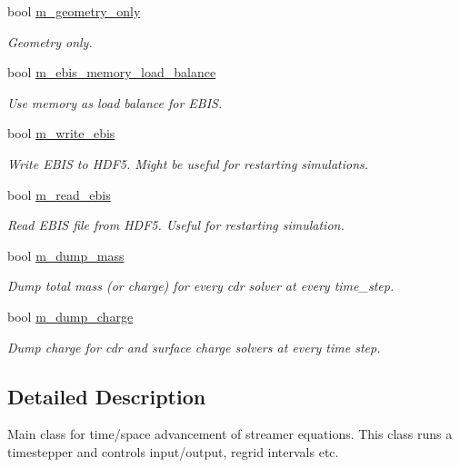 \begin{DoxyCompactItemize}
bool \hyperlink{classplasma__engine_a6f0dc470c441ce1d444fbe82659fb164}{m\+\_\+geometry\+\_\+only}
\begin{DoxyCompactList}\small\item\em Geometry only. \end{DoxyCompactList}\item 
bool \hyperlink{classplasma__engine_a9072ce05c25ffeb433a1522e5d5ec97e}{m\+\_\+ebis\+\_\+memory\+\_\+load\+\_\+balance}
\begin{DoxyCompactList}\small\item\em Use memory as load balance for E\+B\+IS. \end{DoxyCompactList}\item 
bool \hyperlink{classplasma__engine_af9bb6854312d5fd2e8fbf131c0b596a9}{m\+\_\+write\+\_\+ebis}
\begin{DoxyCompactList}\small\item\em Write E\+B\+IS to H\+D\+F5. Might be useful for restarting simulations. \end{DoxyCompactList}\item 
bool \hyperlink{classplasma__engine_a4b1d92e7235153f99ca04250c83bdf91}{m\+\_\+read\+\_\+ebis}
\begin{DoxyCompactList}\small\item\em Read E\+B\+IS file from H\+D\+F5. Useful for restarting simulation. \end{DoxyCompactList}\item 
bool \hyperlink{classplasma__engine_a00b0755dc18e1d98253b9cbde39bd699}{m\+\_\+dump\+\_\+mass}
\begin{DoxyCompactList}\small\item\em Dump total mass (or charge) for every cdr solver at every time\+\_\+step. \end{DoxyCompactList}\item 
bool \hyperlink{classplasma__engine_aaec10f075374d29e0e11b6ce051349c7}{m\+\_\+dump\+\_\+charge}
\begin{DoxyCompactList}\small\item\em Dump charge for cdr and surface charge solvers at every time step. \end{DoxyCompactList}\end{DoxyCompactItemize}


\subsection{Detailed Description}
Main class for time/space advancement of streamer equations. This class runs a timestepper and controls input/output, regrid intervals etc. 

